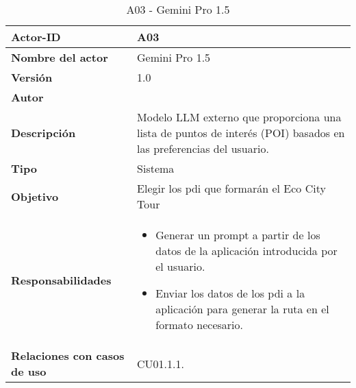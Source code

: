 \begin{table}[p]
	\centering
	\begin{tabularx}{\linewidth}{ p{} p{} }
		\toprule
		\textbf{Actor-ID}    & A03 \\
		\toprule
		\textbf{Nombre del actor} & Gemini Pro 1.5 \\
		\textbf{Versión}              & 1.0    \\
		\textbf{Autor}                & \autor \\
		\textbf{Descripción}          & Modelo LLM externo que proporciona una lista de puntos de interés (POI) basados en las preferencias del usuario. \\
		\textbf{Tipo}                 & Sistema \\
		\textbf{Objetivo}             & Elegir los \acrshort{pdi} que formarán el Eco City Tour \\
		\textbf{Responsabilidades}    & 
		\begin{itemize}
			\tightlist
			\item Generar un prompt a partir de los datos de la aplicación introducida por el usuario.
			\item Enviar los datos de los \acrshort{pdi} a la aplicación para generar la ruta en el formato necesario.
		\end{itemize}\\
		\textbf{Relaciones con casos de uso} & CU01.1.1. \\
		\bottomrule
	\end{tabularx}
	\caption{A03 - Gemini Pro 1.5}
\end{table}

